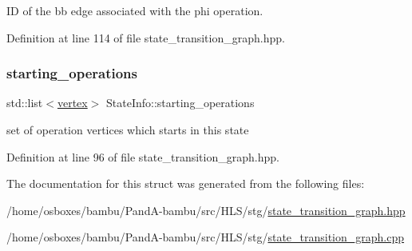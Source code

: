 ID of the bb edge associated with the phi operation. 



Definition at line 114 of file state\+\_\+transition\+\_\+graph.\+hpp.

\mbox{\label{structStateInfo_a6bdb118c9adb909da0722d4bc720c2e4}} 
\subsubsection{\texorpdfstring{starting\+\_\+operations}{starting\_operations}}
{\footnotesize\ttfamily std\+::list$<$\hyperlink{graph_8hpp_abefdcf0544e601805af44eca032cca14}{vertex}$>$ State\+Info\+::starting\+\_\+operations}



set of operation vertices which starts in this state 



Definition at line 96 of file state\+\_\+transition\+\_\+graph.\+hpp.



The documentation for this struct was generated from the following files\+:\begin{DoxyCompactItemize}
\item 
/home/osboxes/bambu/\+Pand\+A-\/bambu/src/\+H\+L\+S/stg/\hyperlink{state__transition__graph_8hpp}{state\+\_\+transition\+\_\+graph.\+hpp}\item 
/home/osboxes/bambu/\+Pand\+A-\/bambu/src/\+H\+L\+S/stg/\hyperlink{state__transition__graph_8cpp}{state\+\_\+transition\+\_\+graph.\+cpp}\end{DoxyCompactItemize}
